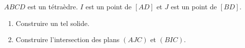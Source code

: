 
$ABCD$ est un tétraèdre. $I$ est un point de $[AD]$ et $J$ est un point de $[BD]$. 

\begin{enumerate}
\item Construire un tel solide.
\item Construire l'intersection des plans $(AJC)$ et $(BIC)$.
\end{enumerate}